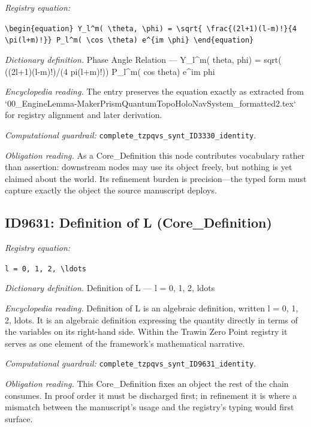 \documentclass[11pt]{article}
\theoremstyle{remark}
\begin{document}
\noindent\textit{Registry equation:}\par
{\small\texttt{\textbackslash{}begin\{equation\} Y\_l\textasciicircum{}m( \textbackslash{}theta, \textbackslash{}phi) = \textbackslash{}sqrt\{ \textbackslash{}frac\{(2l+1)(l-m)!\}\{4 \textbackslash{}pi(l+m)!\}\} P\_l\textasciicircum{}m( \textbackslash{}cos \textbackslash{}theta) e\textasciicircum{}\{im \textbackslash{}phi\} \textbackslash{}end\{equation\}}}\par\medskip
\noindent\textit{Dictionary definition.} Phase Angle Relation --- Y\_l\textasciicircum{}m( theta, phi) = sqrt( ((2l+1)(l-m)!)/(4 pi(l+m)!)) P\_l\textasciicircum{}m( cos theta) e\textasciicircum{}im phi\par\medskip
\noindent\textit{Encyclopedia reading.} The entry preserves the equation exactly as extracted from `00\_EngineLemma-MakerPrismQuantumTopoHoloNavSystem\_formatted2.tex` for registry alignment and later derivation.
\par\medskip\noindent\textit{Computational guardrail:} \texttt{complete\_tzpqvs\_synt\_ID3330\_identity}.
\par\medskip\noindent\textit{Obligation reading.} As a Core\_Definition this node contributes vocabulary rather than assertion: downstream nodes may use its object freely, but nothing is yet claimed about the world. Its refinement burden is precision---the typed form must capture exactly the object the source manuscript deploys.

\subsection{ID9631: Definition of L (Core\_Definition)}

\noindent\textit{Registry equation:}\par
{\small\texttt{l = 0, 1, 2, \textbackslash{}ldots}}\par\medskip
\noindent\textit{Dictionary definition.} Definition of L --- l = 0, 1, 2, ldots\par\medskip
\noindent\textit{Encyclopedia reading.} Definition of L is an algebraic definition, written l = 0, 1, 2, ldots. It is an algebraic definition expressing the quantity directly in terms of the variables on its right-hand side. Within the Trawin Zero Point registry it serves as one element of the framework's mathematical narrative.
\par\medskip\noindent\textit{Computational guardrail:} \texttt{complete\_tzpqvs\_synt\_ID9631\_identity}.
\par\medskip\noindent\textit{Obligation reading.} This Core\_Definition fixes an object the rest of the chain consumes. In proof order it must be discharged first; in refinement it is where a mismatch between the manuscript's usage and the registry's typing would first surface.
\end{document}
